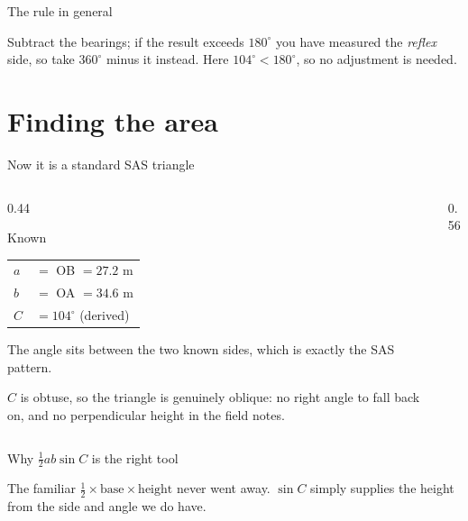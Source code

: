 \documentclass[11pt]{beamer}
\begin{document}
\begin{frame}{The rule in general}
  \vfill
  \begin{center}
    \scalebox{0.75}{\diagBearingRule}
  \end{center}
  \vfill
  {\small Subtract the bearings; if the result exceeds $180^\circ$ you have
  measured the \emph{reflex} side, so take $360^\circ$ minus it instead. Here
  $104^\circ < 180^\circ$, so no adjustment is needed.}
\end{frame}

\section{Finding the area}

\begin{frame}{Now it is a standard SAS triangle}
  \begin{columns}[T]
    \begin{column}{0.44\textwidth}
      \begin{block}{Known}
        \begin{tabular}{@{}ll@{}}
          $a$ & $=$ OB $= 27.2$ m\\[2pt]
          $b$ & $=$ OA $= 34.6$ m\\[2pt]
          $C$ & $= 104^\circ$ (derived)\\
        \end{tabular}
      \end{block}
      \small
      The angle sits \alert{between} the two known sides, which is exactly the
      SAS pattern.
      \medskip

      $C$ is obtuse, so the triangle is genuinely oblique: no right angle to
      fall back on, and no perpendicular height in the field notes.
    \end{column}
    \begin{column}{0.56\textwidth}
      \centering
      \scalebox{0.80}{\diagSAS}
    \end{column}
  \end{columns}
\end{frame}

\begin{frame}{Why $\tfrac12ab\sin C$ is the right tool}
  \vfill
  \begin{center}
    \scalebox{0.80}{\diagHeight}
  \end{center}
  \vfill
  {\small The familiar $\tfrac12\times\text{base}\times\text{height}$ never
  went away. \alert{$\sin C$ simply supplies the height} from the side and
  angle we do have.}
\end{frame}
\end{document}
